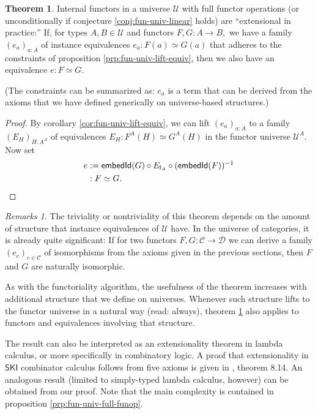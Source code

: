 \documentclass[a4paper]{article}
\theoremstyle{definition}
\newtheorem{theorem}[definition]{Theorem}
\theoremstyle{remark}
\newtheorem*{remarks}{Remarks}
\renewcommand{\equiv}{\simeq}
\newcommand{\C}{\mathcal{C}}
\newcommand{\D}{\mathcal{D}}
\newcommand{\U}{\mathcal{U}}
\newcommand{\nm}{\mathsf}
\newcommand{\combinator}{\nm}
\newcommand{\idFun}{\combinator{I}}
\begin{document}
\begin{theorem}
  \label{thm:extensionality}
  Internal functors in a universe $\U$ with full functor operations (or unconditionally
  if conjecture \ref{conj:fun-univ-linear} holds) are ``extensional in practice:''
  If, for types $A,B \in \U$ and functors $F,G : A \to B,$ we have a family
  $(e_a)_{a : A}$ of instance equivalences $e_a : F(a) \equiv G(a)$ that adheres to the
  constraints of proposition \ref{prp:fun-univ-lift-equiv}, then we also have an
  equivalence $e : F \equiv G.$
\end{theorem}

(The constraints can be summarized as: $e_a$ is a term that can be derived from the
axioms that we have defined generically on universe-based structures.)

\begin{proof}
  By corollary \ref{cor:fun-univ-lift-equiv}, we can lift $(e_a)_{a : A}$ to a
  family $(E_H)_{H : A^A}$ of equivalences $E_H : F^A(H) \equiv G^A(H)$ in the
  functor universe $\U^A.$ Now set
  \begin{align*}
    e &:= \nm{embedId}(G) \circ E_{\idFun_A} \circ (\nm{embedId}(F))^{-1}\\
      &: F \equiv G. \qedhere
  \end{align*}
\end{proof}

\begin{remarks}
  The triviality or nontriviality of this theorem depends on the amount of structure
  that instance equivalences of $\U$ have. In the universe of categories, it is
  already quite significant: If for two functors $F,G : \C \to \D$ we can derive a
  family $(e_c)_{c \in \C}$ of isomorphisms from the axioms given in the previous
  sections, then $F$ and $G$ are naturally isomorphic.

  As with the functoriality algorithm, the usefulness of the theorem increases with
  additional structure that we define on universes. Whenever such structure lifts
  to the functor universe in a natural way (read: always), theorem \ref{thm:extensionality}
  also applies to functors and equivalences involving that structure.

  The result can also be interpreted as an extensionality theorem in lambda calculus,
  or more specifically in combinatory logic. A proof that extensionality in $\nm{SKI}$
  combinator calculus follows from five axioms is given in \cite{hindley-seldin},
  theorem 8.14. An analogous result (limited to simply-typed lambda calculus,
  however) can be obtained from our proof. Note that the main complexity is contained
  in proposition \ref{prp:fun-univ-full-funop}.
\end{remarks}
\end{document}
